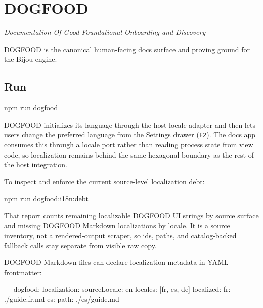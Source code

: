 \chapter{DOGFOOD}\label{record-006}

\smallskip

\emph{Documentation Of Good Foundational Onboarding and Discovery}

DOGFOOD is the canonical human-facing docs surface and proving ground for the Bijou engine.

\section{Run}\label{record-006-run}

\begin{CodeBlock}
npm run dogfood
\end{CodeBlock}

DOGFOOD initializes its language through the host locale adapter and then lets users change the preferred language from the Settings drawer (\texttt{F\allowbreak{}2}). The docs app consumes this through a locale port rather than reading process state from view code, so localization remains behind the same hexagonal boundary as the rest of the host integration.

To inspect and enforce the current source-level localization debt:

\begin{CodeBlock}
npm run dogfood:i18n:debt
\end{CodeBlock}

That report counts remaining localizable DOGFOOD UI strings by source surface and missing DOGFOOD Markdown localizations by locale. It is a source inventory, not a rendered-output scraper, so ids, paths, and catalog-backed fallback calls stay separate from visible raw copy.

DOGFOOD Markdown files can declare localization metadata in YAML frontmatter:

\begin{CodeBlock}
---
dogfood:
  localization:
    sourceLocale: en
    locales: [fr, es, de]
    localized:
      fr: ./guide.fr.md
      es:
        path: ./es/guide.md
---
\end{CodeBlock}

